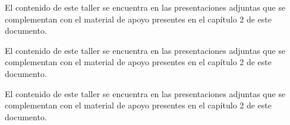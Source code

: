 El contenido de este taller se encuentra en las presentaciones adjuntas que se
complementan con el material de apoyo presentes en el capítulo 2 de este
documento.\cite{Wel03}

El contenido de este taller se encuentra en las presentaciones adjuntas que se
complementan con el material de apoyo presentes en el capítulo 2 de este
documento.\cite{Lit96}

El contenido de este taller se encuentra en las presentaciones adjuntas que se
complementan con el material de apoyo presentes en el capítulo 2 de este
documento.\cite{Tho98w}
